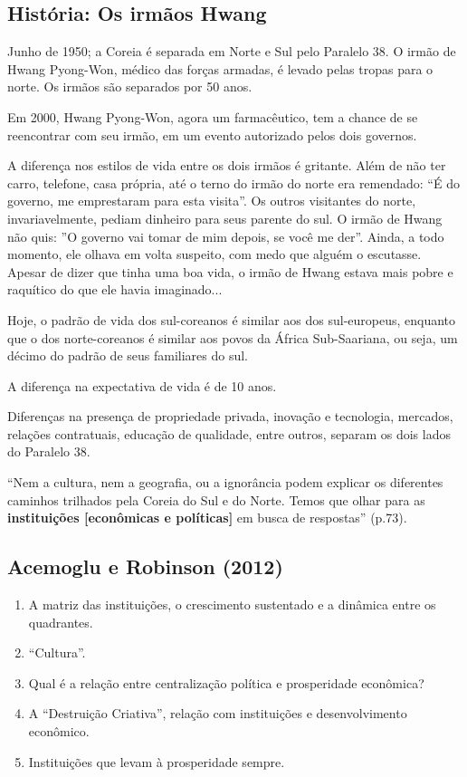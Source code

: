 \documentclass[a4paper,12pt]{article}[abntex2]
\begin{document}
\subsection{\textbf{História: Os irmãos Hwang}}
Junho de 1950; a Coreia é separada em Norte e Sul pelo Paralelo 38. O irmão de Hwang Pyong-Won, médico das forças armadas, é levado pelas tropas para o norte. Os irmãos são separados por 50 anos. 

Em 2000, Hwang Pyong-Won, agora um farmacêutico, tem a chance de se reencontrar com seu irmão, em um evento autorizado pelos dois governos. 

A diferença nos estilos de vida entre os dois irmãos é gritante. Além de não ter carro, telefone, casa própria, até o terno do irmão do norte era remendado: “É do governo, me emprestaram para esta visita”. Os outros visitantes do norte, invariavelmente, pediam dinheiro para seus parente do sul. O irmão de Hwang não quis: ”O governo vai tomar de mim depois, se você me der”. Ainda, a todo momento, ele olhava em volta suspeito, com medo que alguém o escutasse. Apesar de dizer que tinha uma boa vida, o irmão de Hwang estava mais pobre e raquítico do que ele havia imaginado...

Hoje, o padrão de vida dos sul-coreanos é similar aos dos sul-europeus, enquanto que o dos norte-coreanos é similar aos povos da África Sub-Saariana, ou seja, um décimo do padrão de seus familiares do sul. 

A diferença na expectativa de vida é de 10 anos. 

Diferenças na presença de propriedade privada, inovação e tecnologia, mercados, relações contratuais, educação de qualidade, entre outros, separam os dois lados do Paralelo 38.

“Nem a cultura, nem a geografia, ou a ignorância podem explicar os diferentes caminhos trilhados pela Coreia do Sul e do Norte. Temos que olhar para as \textbf{instituições [econômicas e políticas]} em busca de respostas” (p.73).

\subsection{\textbf{Acemoglu e Robinson (2012)}}
\begin{enumerate}
    \item A matriz das instituições, o crescimento sustentado e a dinâmica entre os quadrantes.
    \item “Cultura”.
    \item Qual é a relação entre centralização política e prosperidade econômica?
    \item A “Destruição Criativa”, relação com instituições e desenvolvimento econômico.
    \item Instituições que levam à prosperidade sempre.
\end{enumerate}
\end{document}
